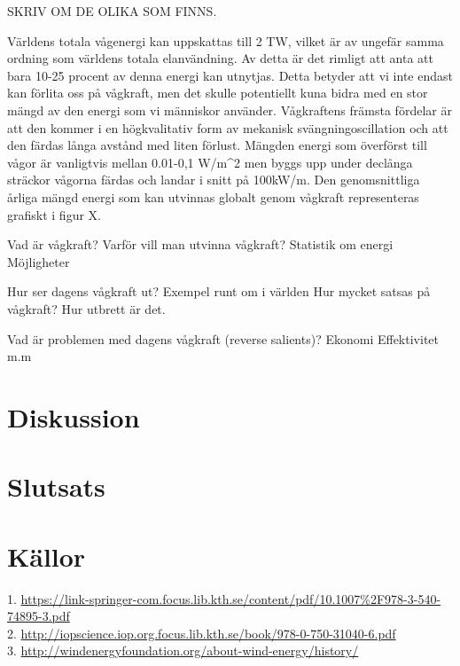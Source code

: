 \documentclass[10pt,a4paper,oneside]{article}
\begin{document}
SKRIV OM DE OLIKA SOM FINNS. 

Världens totala vågenergi kan uppskattas till 2 TW, vilket är av ungefär samma ordning som världens totala elanvändning. Av detta är det rimligt att anta att bara 10-25 procent av denna energi kan utnytjas. Detta betyder att vi inte endast kan förlita oss på vågkraft, men det skulle potentiellt kuna bidra med en stor mängd av den energi som vi människor använder. Vågkraftens främsta fördelar är att den kommer i en högkvalitativ form av mekanisk svängningoscillation och att den färdas långa avstånd med liten förlust. Mängden energi som överförst till vågor är vanligtvis mellan 0.01-0,1 W/m^2 men byggs upp under declånga sträckor vågorna färdas och landar i snitt på 100kW/m. Den genomsnittliga årliga mängd energi som kan utvinnas globalt genom vågkraft representeras grafiskt i figur X. 
 

Vad är vågkraft? 
Varför vill man utvinna vågkraft?
Statistik om energi 
Möjligheter 

Hur ser dagens vågkraft ut?
Exempel runt om i världen
Hur mycket satsas på vågkraft?
Hur utbrett är det.

Vad är problemen med dagens vågkraft (reverse salients)?
Ekonomi
Effektivitet 
m.m 

\section{Diskussion}

\section{Slutsats}

\section{Källor}
1. \url{https://link-springer-com.focus.lib.kth.se/content/pdf/10.1007%2F978-3-540-74895-3.pdf} \\
2. \url{http://iopscience.iop.org.focus.lib.kth.se/book/978-0-750-31040-6.pdf} \\
3. \url{http://windenergyfoundation.org/about-wind-energy/history/} \\



\end{document}
